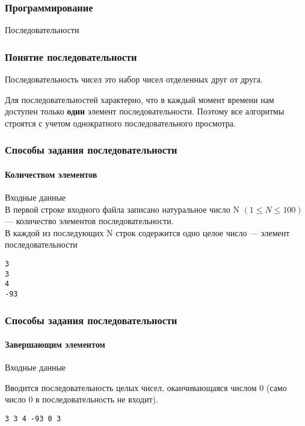 \subtitle{Лекция 12 --- Программирование: Обработка последовательностей (однопроходные алгоритмы)}

\frame[plain]
{\titlepage}	%


\begin{frame}
\frametitle{Программирование}

\begin{center}

\Huge
Последовательности
\end{center}
\end{frame}

	\begin{frame}
\frametitle{Понятие последовательности}

Последовательность чисел это набор чисел отделенных друг от друга.

Для последовательностей характерно, что в каждый момент времени нам доступен только \textbf{один} элемент последовательности. Поэтому все алгоритмы строятся с учетом однократного последовательного просмотра. 

\end{frame}

\begin{frame}[fragile]
\frametitle{Способы задания последовательности}
\framesubtitle{Количеством элементов}

\setlength{\columnsep}{1cm}
\begin{multicols}{2}
\small
Входные данные\\
В первой строке входного файла записано натуральное число N $(1 \leq N \leq 100)$ --- количество элементов последовательности.\\
В каждой из последующих N строк содержится одно целое число --- элемент последовательности
\begin{verbatim}
3
3
4
-93
\end{verbatim}

\columnbreak

\pause

\end{multicols}


\end{frame}

\begin{frame}[fragile]
\frametitle{Способы задания последовательности}
\framesubtitle{Завершающим элементом}

\setlength{\columnsep}{1cm}
\begin{multicols}{2}
\small
Входные данные

Вводится последовательность целых чисел, оканчивающаяся числом 0 (само число 0 в последовательность не входит).
\begin{verbatim}
3 3 4 -93 0 3
\end{verbatim}

\columnbreak

\pause

\end{multicols}


\end{frame}

